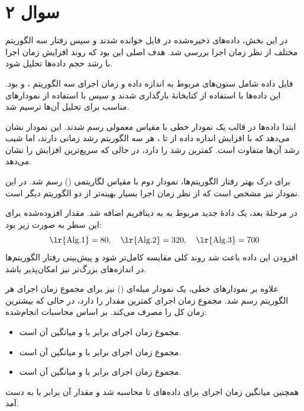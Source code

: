 \documentclass[a4paper]{article}
\begin{document}
	\newpage
	
	\section*{سوال ۲}
	در این بخش، داده‌های ذخیره‌شده در فایل  خوانده شدند و سپس رفتار سه الگوریتم مختلف از نظر زمان اجرا بررسی شد. هدف اصلی این بود که روند افزایش زمان اجرا با رشد حجم داده‌ها تحلیل شود.
	
	فایل داده شامل ستون‌های مربوط به اندازه داده و زمان اجرای سه الگوریتم ،  و  بود. این داده‌ها با استفاده از کتابخانۀ  بارگذاری شدند و سپس با استفاده از  نمودارهای مناسب برای تحلیل آن‌ها ترسیم شد.
	
	ابتدا داده‌ها در قالب یک نمودار خطی با مقیاس معمولی رسم شدند. این نمودار نشان می‌دهد که با افزایش اندازه داده از  تا ، هر سه الگوریتم رشد زمانی دارند، اما شیب رشد آن‌ها متفاوت است.  کمترین رشد را دارد، در حالی که  سریع‌ترین افزایش را نشان می‌دهد.
	
	برای درک بهتر رفتار الگوریتم‌ها، نمودار دوم با مقیاس لگاریتمی () رسم شد. در این نمودار نیز مشخص است که  از نظر زمان اجرا بسیار بهینه‌تر از دو الگوریتم دیگر است.
	
	در مرحلۀ بعد، یک دادۀ جدید مربوط به  به دیتافریم اضافه شد. مقدار افزوده‌شده برای این سطر به صورت زیر بود:
	\[
	\text{\lr{Alg.1}}=80,\quad \text{\lr{Alg.2}}=320,\quad \text{\lr{Alg.3}}=700
	\]
	افزودن این داده باعث شد روند کلی مقایسه کامل‌تر شود و پیش‌بینی رفتار الگوریتم‌ها در اندازه‌های بزرگ‌تر نیز امکان‌پذیر باشد.
	
	علاوه بر نمودارهای خطی، یک نمودار میله‌ای () نیز برای مجموع زمان اجرای هر الگوریتم رسم شد. مجموع زمان اجرای  کمترین مقدار را دارد، در حالی که  بیشترین زمان کل را مصرف می‌کند. بر اساس محاسبات انجام‌شده:
	\begin{itemize}
		\item مجموع زمان اجرای  برابر با  و میانگین آن  است.
		\item مجموع زمان اجرای  برابر با  و میانگین آن  است.
		\item مجموع زمان اجرای  برابر با  و میانگین آن  است.
	\end{itemize}
	
	همچنین میانگین زمان اجرای  برای داده‌های  تا  محاسبه شد و مقدار آن برابر با \textbf{} به دست آمد.
	
\end{document}
